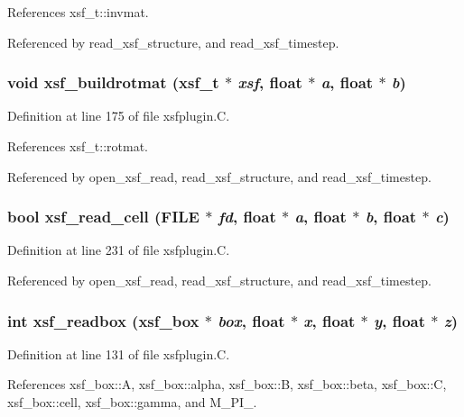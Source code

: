 References xsf\_\-t::invmat.

Referenced by read\_\-xsf\_\-structure, and read\_\-xsf\_\-timestep.
\subsubsection{\setlength{\rightskip}{0pt plus 5cm}void xsf\_\-buildrotmat ({\bf xsf\_\-t} $\ast$ {\em xsf}, float $\ast$ {\em a}, float $\ast$ {\em b})\hspace{0.3cm}{\tt  [static]}}\label{xsfplugin_8C_a34}




Definition at line 175 of file xsfplugin.C.

References xsf\_\-t::rotmat.

Referenced by open\_\-xsf\_\-read, read\_\-xsf\_\-structure, and read\_\-xsf\_\-timestep.
\subsubsection{\setlength{\rightskip}{0pt plus 5cm}bool xsf\_\-read\_\-cell (FILE $\ast$ {\em fd}, float $\ast$ {\em a}, float $\ast$ {\em b}, float $\ast$ {\em c})\hspace{0.3cm}{\tt  [static]}}\label{xsfplugin_8C_a37}




Definition at line 231 of file xsfplugin.C.

Referenced by open\_\-xsf\_\-read, read\_\-xsf\_\-structure, and read\_\-xsf\_\-timestep.
\subsubsection{\setlength{\rightskip}{0pt plus 5cm}int xsf\_\-readbox ({\bf xsf\_\-box} $\ast$ {\em box}, float $\ast$ {\em x}, float $\ast$ {\em y}, float $\ast$ {\em z})\hspace{0.3cm}{\tt  [static]}}\label{xsfplugin_8C_a33}




Definition at line 131 of file xsfplugin.C.

References xsf\_\-box::A, xsf\_\-box::alpha, xsf\_\-box::B, xsf\_\-box::beta, xsf\_\-box::C, xsf\_\-box::cell, xsf\_\-box::gamma, and M\_\-PI\_.

